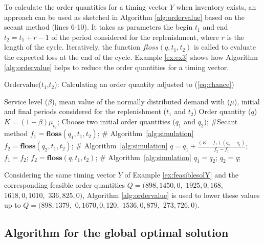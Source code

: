 To calculate the order quantities for a timing vector $Y$ when inventory exists, an approach can be used as sketched in Algorithm \ref{alg:ordervalue} based on the secant method (lines 6-10). It takes as parameters the begin $t_1$ and end $t_2=t_1+r-1$ of the period considered for the replenishment, where $r$ is the length of the cycle.
Iteratively, the function $floss(q,t_1,t_2)$ is called to evaluate the expected loss at the end of the cycle. Example \ref{ex:ex3} shows how Algorithm \ref{alg:ordervalue} helps to reduce the order quantities for a timing vector.


 \begin{algorithm}[!hbt]
 \caption{Ordervalue($t_1$,$t_2$): Calculating an order quantity adjusted to (\ref{eq:chance})}
 \label{alg:ordervalue}
 \begin{algorithmic}[1]
 \REQUIRE Service level ($\beta$), mean value of the normally distributed demand with ($\mu$), initial and final periods
considered for the replenishment ($t_1$ and $t_2$)
 \ENSURE Order quantity ($q$)
 \medskip
 \STATE $K=(1-\beta) \mu_{t_2}$;
 \STATE Choose two initial order quantities ($q_1$ and $q_2$); \hfill \#Secant method
 \STATE $f_1 = \textbf{floss}(q_1,t_1,t_2)$; \hfill \# Algorithm~\ref{alg:simulation}
 \STATE  $f_2 = \textbf{floss}(q_2,t_1,t_2)$; \hfill \# Algorithm~\ref{alg:simulation}
 \STATE $q = q_1 + \frac{(K-f_1)(q_2-q_1)}{f_2-f_1}$;
 \STATE $f_1 = f_2$;
 \STATE $f_2 = \textbf{floss}(q,t_1,t_2)$; \hfill  \# Algorithm~\ref{alg:simulation}
 \STATE $q_1 = q_2$;
 \STATE $q_2 = q$;
 \ENDWHILE
 \vskip 5pt
 \end{algorithmic}
 \end{algorithm}


\begin{example}
\label{ex:ex3}
	Considering the same timing vector $Y$ of Example \ref{ex:feasiblesolY} and the corresponding feasible order quantities  $Q=(898,1450,0,$ $1925,0,168,$ $1618,0,1010,$ $336,825,0)$, Algorithm \ref{alg:ordervalue} is used to lower these values up to $Q= (898,1379,$ $0,1670,0,120,$ $1536,0,879,$ $273,726,0)$.
\end{example}

\subsection{Algorithm for the global optimal solution}

